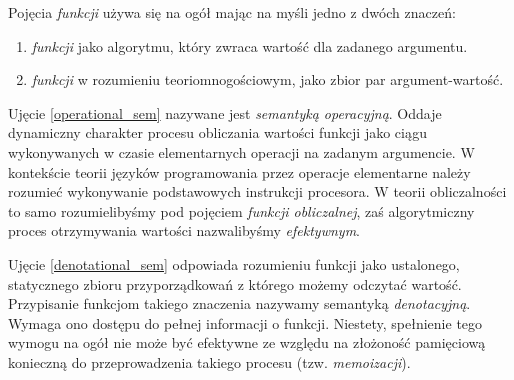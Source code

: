 Pojęcia \emph{funkcji} używa się na ogół mając na myśli jedno z dwóch znaczeń:
\begin{enumerate}[label=(\alph*)]
  \setlength\itemsep{0em}
  \item \emph{funkcji} jako algorytmu, który zwraca wartość dla zadanego argumentu.\label{operational_sem}
  \item \emph{funkcji} w rozumieniu teoriomnogościowym, jako zbior par argument-wartość.
\label{denotational_sem}
\end{enumerate}
Ujęcie \ref{operational_sem} nazywane jest \emph{semantyką operacyjną}. Oddaje dynamiczny charakter procesu obliczania wartości funkcji jako ciągu wykonywanych w czasie elementarnych operacji na zadanym argumencie. W kontekście teorii języków programowania przez operacje elementarne należy rozumieć wykonywanie podstawowych instrukcji procesora. W teorii obliczalności to samo rozumielibyśmy pod pojęciem \emph{funkcji obliczalnej}, zaś algorytmiczny proces otrzymywania wartości nazwalibyśmy \emph{efektywnym}.

Ujęcie \ref{denotational_sem} odpowiada rozumieniu funkcji jako ustalonego, statycznego zbioru przyporządkowań z którego możemy odczytać wartość. Przypisanie funkcjom takiego znaczenia nazywamy semantyką \emph{denotacyjną}. Wymaga ono dostępu do pełnej informacji o funkcji. Niestety, spełnienie tego wymogu na ogół nie może być efektywne ze względu na złożoność pamięciową konieczną do przeprowadzenia takiego procesu (tzw. \emph{memoizacji}).

